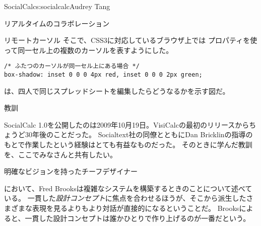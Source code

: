 \begin{aosachapter}{SocialCalc}{s:socialcalc}{Audrey Tang}
\begin{aosasect1}{リアルタイムのコラボレーション}
\begin{aosasect2}{リモートカーソル}
そこで、CSS3に対応しているブラウザ上では
プロパティを使って同一セル上の複数のカーソルを表すようにした。

\begin{verbatim}
/* ふたつのカーソルが同一セル上にある場合 */
box-shadow: inset 0 0 0 4px red, inset 0 0 0 2px green;
\end{verbatim}

は、四人で同じスプレッドシートを編集したらどうなるかを示す図だ。


\end{aosasect2}

\end{aosasect1}

\begin{aosasect1}{教訓}

SocialCalc 1.0を公開したのは2009年10月19日。VisiCalcの最初のリリースからちょうど30年後のことだった。
Socialtext社の同僚とともにDan Bricklinの指導のもとで作業したという経験はとても有益なものだった。
そのときに学んだ教訓を、ここでみなさんと共有したい。

\begin{aosasect2}{明確なビジョンを持ったチーフデザイナー}

\cite{bib:brooks:design}において、Fred Brooksは複雑なシステムを構築するときのことについて述べている。
一貫した\emph{設計コンセプト}に焦点を合わせるほうが、そこから派生したさまざまな表現を見るよりもより対話が直接的になるということだ。
Brooksによると、一貫した設計コンセプトは誰かひとりで作り上げるのが一番だという。


\end{aosasect2}
\end{aosasect1}
\end{aosachapter}

